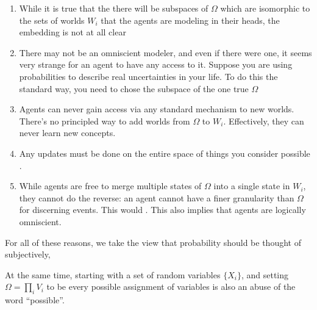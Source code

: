 \documentclass{article}
\begin{document}
	
	\begin{enumerate}
		\item While it is true that the there will be subspaces of $\Omega$ which are isomorphic to the sets of worlds $W_i$ that the agents are modeling in their heads, the embedding is not at all clear \todo{}
		
		\item There may not be an omniscient modeler, and even if there were one, it seems very strange for an agent to have any access to it. Suppose you are using probabilities to describe real uncertainties in your life. To do this the standard way, you need to chose the subspace of the one true $\Omega$ 
		
		\item Agents can never gain access via any standard mechanism to new worlds. There's no principled way to add worlds from $\Omega$ to $W_i$. Effectively, they can never learn new concepts.
		
		\item Any updates must be done on the entire space of things you consider possible .
		
		\item While agents are free to merge multiple states of $\Omega$ into a single state in $W_i$, they cannot do the reverse: an agent cannot have a finer granularity than $\Omega$ for discerning events. This would . This also implies that agents are logically omniscient.
	\end{enumerate}
	
	For all of these reasons, we take the view that probability should be thought of subjectively,
	
	
	At the same time, starting with a set of random variables $\{X_i\}$, and setting $\Omega = \prod_{i} V_i$ to be every possible assignment of variables is also an abuse of the word ``possible''.
	
\end{document}
